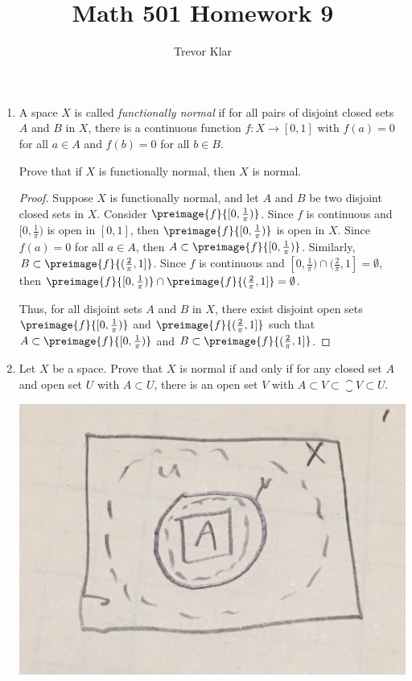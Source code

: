 \documentclass[letterpaper]{article}
\title{Math 501 \linebreak
Homework 9}
\author{Trevor Klar}
\begin{document}
\maketitle

\begin{enumerate}
\item A space $X$ is called \emph{functionally normal} if for all pairs of disjoint closed sets $A$ and $B$ in $X$, there is a continuous function $f:X\to [0,1]$ with $f(a)=0$ for all $a\in A$ and $f(b)=0$ for all $b\in B$. 

Prove that if $X$ is functionally normal, then $X$ is normal. 

\begin{proof}
Suppose $X$ is functionally normal, and let $A$ and $B$ be two disjoint closed sets in $X$. Consider $\preimage{f}{[0,\frac{1}{\pi})}$. Since $f$ is continuous and $[0,\frac{1}{\pi})$ is open in $[0,1]$, then $\preimage{f}{[0,\frac{1}{\pi})}$ is open in $X$. Since $f(a)=0$ for all $a\in A$, then $A\subset\preimage{f}{[0,\frac{1}{\pi})}$. Similarly, $B\subset \preimage{f}{(\frac{2}{\pi},1]}$. Since $f$ is continuous and $[0,\frac{1}{\pi})\cap (\frac{2}{\pi},1]=\emptyset$, then $\preimage{f}{[0,\frac{1}{\pi})}\cap \preimage{f}{(\frac{2}{\pi},1]}=\emptyset$. 

Thus, for all disjoint sets $A$ and $B$ in $X$, there exist disjoint open sets $\preimage{f}{[0,\frac{1}{\pi})}$ and $\preimage{f}{(\frac{2}{\pi},1]}$ such that $A \subset \preimage{f}{[0,\frac{1}{\pi})}$ and $B\subset \preimage{f}{(\frac{2}{\pi},1]}$. 
\end{proof}

\item Let $X$ be a space. Prove that $X$ is normal if and only if for any closed set $A$ and open set $U$ with $A \subset U$, there is an open set $V$ with $A \subset V \subset \closure{V} \subset U$.

\begin{center}
\includegraphics[scale=.1]{hw9_prob2_forward}
\end{center}


\end{enumerate}
\end{document}
